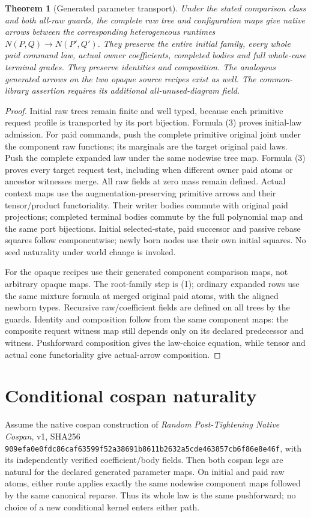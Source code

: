 \documentclass[11pt]{article}\usepackage{amsmath,amssymb,amsthm,geometry}\geometry{margin=1in}
\newtheorem{theorem}{Theorem}
\begin{document}
\begin{theorem}[Generated parameter transport]
Under the stated comparison class and both all-raw guards, the complete raw tree and configuration maps give native arrows between the corresponding heterogeneous runtimes $N(P,Q)\to N(P',Q')$. They preserve the entire initial family, every whole paid command law, actual owner coefficients, completed bodies and full whole-case terminal grades. They preserve identities and composition. The analogous generated arrows on the two opaque source recipes exist as well. The common-library assertion requires its additional all-unused-diagram field.
\end{theorem}
\begin{proof}
Initial raw trees remain finite and well typed, because each primitive request profile is transported by its port bijection. Formula (3) proves initial-law admission. For paid commands, push the complete primitive original joint under the component raw functions; its marginals are the target original paid laws. Push the complete expanded law under the same nodewise tree map. Formula (3) proves every target request test, including when different owner paid atoms or ancestor witnesses merge. All raw fields at zero mass remain defined. Actual context maps use the augmentation-preserving primitive arrows and their tensor/product functoriality. Their writer bodies commute with original paid projections; completed terminal bodies commute by the full polynomial map and the same port bijections. Initial selected-state, paid successor and passive rebase squares follow componentwise; newly born nodes use their own initial squares. No seed naturality under world change is invoked.

For the opaque recipes use their generated component comparison maps, not arbitrary opaque maps. The root-family step is (1); ordinary expanded rows use the same mixture formula at merged original paid atoms, with the aligned newborn types. Recursive raw/coefficient fields are defined on all trees by the guards. Identity and composition follow from the same component maps: the composite request witness map still depends only on its declared predecessor and witness. Pushforward composition gives the law-choice equation, while tensor and actual cone functoriality give actual-arrow composition.
\end{proof}

\section{Conditional cospan naturality}
Assume the native cospan construction of \emph{Random Post-Tightening Native Cospan}, v1, SHA256 \texttt{909efa0e0fdc86caf63599f52a38691b8611b2632a5cde463857cb6f86e8e46f}, with its independently verified coefficient/body fields. Then both cospan legs are natural for the declared generated parameter maps. On initial and paid raw atoms, either route applies exactly the same nodewise component maps followed by the same canonical reparse. Thus its whole law is the same pushforward; no choice of a new conditional kernel enters either path.
\end{document}
